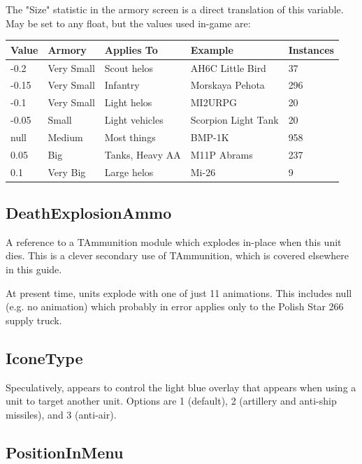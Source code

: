\documentclass{article}
\begin{document}
The "Size" statistic in the armory screen is a direct translation of this variable. May be set to any float, but the values used in-game are:

\begin{center}
    \begin{tabular}{ | l | l | l | l | l |}
    \hline
	Value & Armory & Applies To & Example & Instances \\ \hline
	-0.2  &  Very Small & Scout helos & AH6C Little Bird  & 37\\
	-0.15 & Very Small & Infantry & Morskaya Pehota & 296 \\
	-0.1 & Very Small & Light helos & MI2URPG & 20 \\
	-0.05 & Small & Light vehicles & Scorpion Light Tank & 20\\
	null & Medium & Most things & BMP-1K & 958 \\
	0.05 & Big & Tanks, Heavy AA & M11P Abrams & 237\\
	0.1 & Very Big & Large helos & Mi-26 & 9\\	
    \hline
    \end{tabular}
\end{center}

\subsection{DeathExplosionAmmo}

A reference to a TAmmunition module which explodes in-place when this unit dies. This is a clever secondary use of TAmmunition, which is covered elsewhere in this guide.

At present time, units explode with one of just 11 animations. This includes null (e.g. no animation) which probably in error applies only to the Polish Star 266 supply truck.

\subsection{IconeType}

Speculatively, appears to control the light blue overlay that appears when using a unit to target another unit. Options are 1 (default), 2 (artillery and anti-ship missiles), and 3 (anti-air).

\subsection{PositionInMenu}
\end{document}
